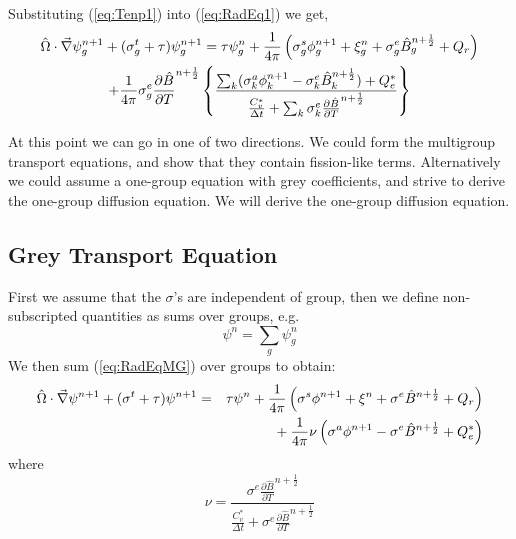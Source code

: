 \documentclass[12pt]{article}
\newcommand{\dt}{\ensuremath{\Delta t}}
\newcommand{\Cvs}{\ensuremath{C_{v}^{*}}}
\newcommand{\Bnphlf}{\ensuremath{\hat{B}^{n+\frac{1}{2}}}}
\newcommand{\pBnphlfdT}{\ensuremath{\frac{\partial\hat{B}}{\partial T}^{n+\frac{1}{2}}}}
\newcommand{\Bgnphlf}{\ensuremath{\hat{B}_{g}^{n+\frac{1}{2}}}}
\newcommand{\pBgnphlfdT}{\ensuremath{\frac{\partial\hat{B}}{\partial T}^{n+\frac{1}{2}}}}
\newcommand{\Bknphlf}{\ensuremath{\hat{B}_{k}^{n+\frac{1}{2}}}}
\newcommand{\pBknphlfdT}{\ensuremath{\frac{\partial\hat{B}}{\partial T}^{n+\frac{1}{2}}}}
\begin{document}
Substituting (\ref{eq:Tenp1}) into (\ref{eq:RadEq1}) we get,
\begin{multline}
\hat{\Omega} \cdot \del \psi^{n+1}_{g} + (\sigma^{t}_{g} + \tau) \psi^{n+1}_{g}
        =
         \tau \psi_{g}^{n}
        + \frac{1}{4\pi} \left(
                \sigma^{s}_{g} \phi^{n+1}_{g}
                + \xi_{g}^{n}
                + \sigma^{e}_{g} \Bgnphlf + Q_{r}\right)
        \\
        + \frac{1}{4\pi} \sigma^{e}_{g} \pBgnphlfdT
                \left\{ \frac{\sum_{k} (\sigma_{k}^{a}\phi_{k}^{n+1} 
                                        - \sigma_{k}^{e}\Bknphlf) + Q_{e}^{*}}
                             {\frac{\Cvs}{\dt} + \sum_{k} \sigma_{k}^{e}\pBknphlfdT}
                \right\}
\label{eq:RadEqMG}
\end{multline}

At this point we can go in one of two directions.  We could form the
multigroup transport equations, and show that they contain fission-like terms.
Alternatively we could assume a one-group equation
with grey coefficients, and strive to derive the
one-group diffusion equation.  We will derive the one-group diffusion equation.

\subsection{Grey Transport Equation}

First we assume that the $\sigma$'s are independent of group, then
we define non-subscripted quantities as sums over groups, e.g.
\begin{equation}
        \psi^{n} = \sum_{g} \psi_{g}^{n}
\end{equation}
We then sum (\ref{eq:RadEqMG}) over groups to obtain:
\begin{eqnarray}
\hat{\Omega} \cdot \del \psi^{n+1} + (\sigma^{t} + \tau) \psi^{n+1}
        &=& \tau \psi^{n}
        + \frac{1}{4\pi} \left( \sigma^{s} \phi^{n+1}
                        + \xi^{n}
                        + \sigma^{e} \Bnphlf + Q_{r} \right)
        \nonumber \\
        & & \mbox{}
        + \frac{1}{4\pi} \nu \left( \sigma^{a}\phi^{n+1}
                                        - \sigma^{e}\Bnphlf + Q_{e}^{*}\right)
\label{eq:RadEqGrey}
\end{eqnarray}
where
\begin{equation}
        \nu = \frac{\sigma^{e} \pBnphlfdT } {\frac{\Cvs}{\dt}
                                             + \sigma^{e}\pBnphlfdT}
\end{equation}
\end{document}
